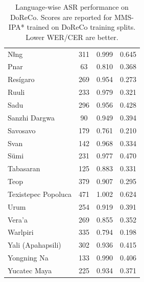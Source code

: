 \begin{table}[t]
\begin{tabular}{lccc}
Nǁng & 311 & 0.999 & 0.645 \\
Pnar & 63 & 0.810 & 0.368 \\
Resígaro & 269 & 0.954 & 0.273 \\
Ruuli & 233 & 0.979 & 0.321 \\
Sadu & 296 & 0.956 & 0.428 \\
Sanzhi Dargwa & 90 & 0.949 & 0.394 \\
Savosavo & 179 & 0.761 & 0.210 \\
Svan & 142 & 0.968 & 0.334 \\
Sümi & 231 & 0.977 & 0.470 \\
Tabasaran & 125 & 0.883 & 0.331 \\
Teop & 379 & 0.907 & 0.295 \\
Texistepec Popoluca & 471 & 1.002 & 0.624 \\
Urum & 254 & 0.919 & 0.391 \\
Vera'a & 269 & 0.855 & 0.352 \\
Warlpiri & 335 & 0.794 & 0.198 \\
Yali (Apahapsili) & 302 & 0.936 & 0.415 \\
Yongning Na & 133 & 0.990 & 0.406 \\
Yucatec Maya & 225 & 0.934 & 0.371 \\
\bottomrule
\end{tabular}
\caption{Language-wise ASR performance on DoReCo. Scores are reported for MMS-IPA* trained on DoReCo training splits. Lower WER/CER are better.}
\label{tab:doreco_asr}
\end{table}